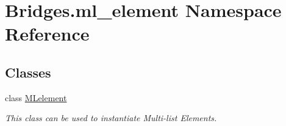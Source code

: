 \hypertarget{namespace_bridges_1_1ml__element}{}\section{Bridges.\+ml\+\_\+element Namespace Reference}
\label{namespace_bridges_1_1ml__element}
\subsection*{Classes}
\begin{DoxyCompactItemize}
\item 
class \mbox{\hyperlink{class_bridges_1_1ml__element_1_1_m_lelement}{M\+Lelement}}
\begin{DoxyCompactList}\small\item\em This class can be used to instantiate Multi-\/list Elements. \end{DoxyCompactList}\end{DoxyCompactItemize}
